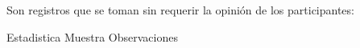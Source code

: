 
\question Son registros que se toman sin requerir la opinión de los
          participantes:

  \begin{oneparchoices}
    \choice Estadistica
    \choice Muestra
    \CorrectChoice Observaciones
  \end{oneparchoices}
